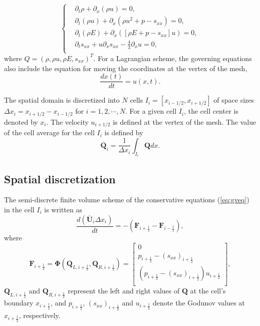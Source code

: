 \documentclass{article}
\numberwithin{equation}{section}
\numberwithin{table}{section}
\begin{document}
\begin{equation}\label{eq:gveq}
   \left\{ \begin{aligned}
	   & \partial _t \rho +\partial_x(\rho u)=0,\\
	   & \partial _t (\rho u)+\partial_x(\rho u^2 + p -s_{xx})=0,\\
	   &\partial _t (\rho E)+\partial_x([\rho E + p -s_{xx}]u)=0,\\
	   &\partial _t s_{xx}+u\partial_xs_{xx}-\frac{4}{3}\partial_x u=0,\\
	   \end{aligned}\right.
\end{equation}
where $Q = (\rho, \rho u, \rho E, s_{xx})^T$.  For a Lagrangian scheme, the governing equations also include the equation for moving the coordinates at the vertex of the mesh,
\begin{equation}\label{eq:dxt}
  \frac{dx(t)}{dt} = u(x,t).
\end{equation}

The spatial domain is discretized into $N$ cells $I_i = [x_{i-1/2}, x_{i+1/2}]$ of space sizes $\Delta x_i = x_{i+1/2} - x_{i-1/2}$ for $i = 1,2,\cdots,N$. For a given cell $I_i$, the cell center is denoted by $x_i$. The velocity $u_{i+1/2}$ is defined at the vertex of the mesh. The  value of the cell average for the cell $I_i$ is defined by
\begin{equation}
  \overline{\bm{Q}}_i = \frac{1}{\Delta x_i} \int_{I_i} \bm{Q} dx.
\end{equation}
\subsection{Spatial discretization}
The  semi-discrete finite volume scheme of the conservative equations (\ref{eq:gveq}) in the cell $I_i$ is written as
\begin{equation}\label{eq:sem}
  \frac{d(\overline{\bm{U}}_i\Delta x_i)}{dt} = -(\bm{F}_{i+\frac{1}{2}} - \bm{F}_{i-\frac{1}{2}}),
\end{equation}
where 
\begin{equation}
  \bm{F}_{i+\frac{1}{2}} = \bm{\Phi} (\bm{Q}_{L,i+\frac{1}{2}}, \bm{Q}_{R,i+\frac{1}{2}})  = \left[ 
	\begin{array}{l}
	  0\\
	  p_{i+\frac{1}{2}} - (s_{xx})_{i+\frac{1}{2}}\\
	  (p_{i+\frac{1}{2}} - (s_{xx})_{i+\frac{1}{2}})u_{i+\frac{1}{2}}\\
	\end{array}
  \right],
\end{equation}
$\bm{Q}_{L,i+\frac{1}{2}}$ and $\bm{Q}_{R,i+\frac{1}{2}}$ represent the left and right values of $\bm{Q}$ at the cell's boundary $x_{i+\frac{1}{2}}$, and  $p_{i+\frac{1}{2}}$, $(s_{xx})_{i+\frac{1}{2}}$ and $u_{i+\frac{1}{2}}$ denote the Godunov values at $x_{i+\frac{1}{2}}$, respectively. 
\end{document}
